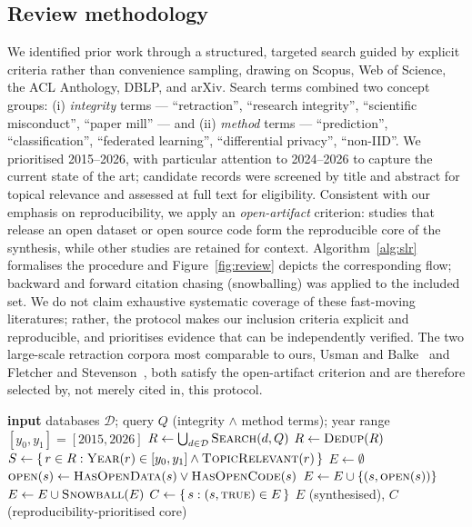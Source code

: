 \documentclass[review,12pt]{elsarticle}
\begin{document}
\subsection{Review methodology}
\label{sec:review-method}
We identified prior work through a structured, targeted search guided by
explicit criteria rather than convenience sampling, drawing on Scopus, Web of
Science, the ACL Anthology, DBLP, and arXiv. Search terms combined two concept
groups: (i) \emph{integrity} terms --- ``retraction'', ``research integrity'',
``scientific misconduct'', ``paper mill'' --- and (ii) \emph{method} terms ---
``prediction'', ``classification'', ``federated learning'', ``differential
privacy'', ``non-IID''. We prioritised 2015--2026, with particular attention to
2024--2026 to capture the current state of the art; candidate records were
screened by title and abstract for topical relevance and assessed at full text
for eligibility. Consistent with our emphasis on reproducibility, we apply an
\emph{open-artifact} criterion: studies that release an open dataset or open
source code form the reproducible core of the synthesis, while other studies
are retained for context. Algorithm~\ref{alg:slr} formalises the procedure and
Figure~\ref{fig:review} depicts the corresponding flow; backward and forward
citation chasing (snowballing) was applied to the included set. We do not claim
exhaustive systematic coverage of these fast-moving literatures; rather, the
protocol makes our inclusion criteria explicit and reproducible, and
prioritises evidence that can be independently verified. The two large-scale retraction corpora most comparable to ours,
Usman and Balke~\cite{ref_usman_websci25} and Fletcher and
Stevenson~\cite{ref_fletcher}, both satisfy the open-artifact criterion and
are therefore selected by, not merely cited in, this protocol.

\begin{algorithm}[t]
\caption{Systematic, reproducibility-prioritised study selection}
\label{alg:slr}
\begin{algorithmic}[1]
\State \textbf{input} databases $\mathcal{D}$; query $Q$ (integrity $\wedge$ method terms);
year range $[y_0,y_1]{=}[2015,2026]$
\State $R \gets \bigcup_{d\in\mathcal{D}} \textsc{Search}(d, Q)$
\State $R \gets \textsc{Dedup}(R)$ 
\State $S \gets \{\, r \in R : \textsc{Year}(r)\in[y_0,y_1] \wedge \textsc{TopicRelevant}(r)\,\}$
\State $E \gets \emptyset$
 
    \State $\textsc{open}(s) \gets \textsc{HasOpenData}(s) \vee \textsc{HasOpenCode}(s)$
    \State $E \gets E \cup \{(s,\textsc{open}(s))\}$
  \EndIf
\EndFor
\State $E \gets E \cup \textsc{Snowball}(E)$ 
\State $C \gets \{\, s : (s,\textsc{true}) \in E \,\}$ 
\State \Return $E$ (synthesised), $C$ (reproducibility-prioritised core)
\end{algorithmic}
\end{algorithm}
\end{document}
